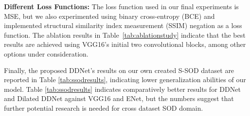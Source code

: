 \documentclass{article}
\begin{document}
\vspace{1mm}
\noindent
\textbf{Different Loss Functions:} The loss function used in our final experiments is MSE, but we also experimented using binary cross-entropy (BCE) and implemented structural similarity index measurement (SSIM) negation as a loss function. The ablation results in Table~\ref{tab:ablationstudy} indicate that the best results are achieved using VGG16's initial two convolutional blocks, among other options under consideration.

Finally, the proposed DDNet's results on our own created S-SOD dataset are reported in Table \ref{tab:ssodresults}, indicating lower generalization abilities of our model. Table \ref{tab:ssodresults} indicates comparatively better results for DDNet and Dilated DDNet against VGG16 and ENet, but the numbers suggest that further potential research is needed for cross dataset SOD domain.

\begin{table}[tbp]
\caption{Experimental results of DDNet over the proposed S-SOD.}\vspace{-3mm}
\begin{center}
\end{center}
\label{tab:ssodresults}
\vspace{-3mm}
\end{table}
\end{document}
